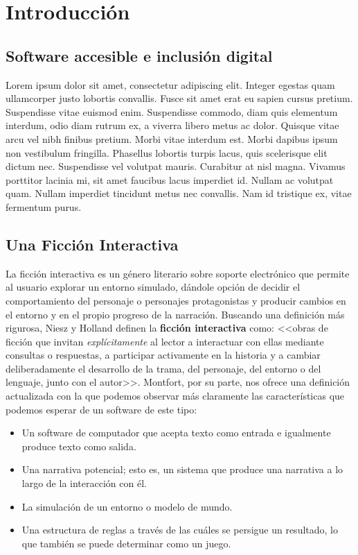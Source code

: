 
\chapter{Introducción}\label{ch:introduccion}

\section{Software accesible e inclusión digital}

Lorem ipsum dolor sit amet\cite{Wilson:2002}, consectetur adipiscing elit. Integer egestas quam ullamcorper justo lobortis convallis. Fusce sit amet erat eu sapien cursus pretium. Suspendisse vitae euismod enim. Suspendisse commodo, diam quis elementum interdum, odio diam rutrum ex, a viverra libero metus ac dolor. Quisque vitae arcu vel nibh finibus pretium. Morbi vitae interdum est. Morbi dapibus ipsum non vestibulum fringilla. Phasellus lobortis turpis lacus, quis scelerisque elit dictum nec. Suspendisse vel volutpat mauris. Curabitur at nisl magna. Vivamus porttitor lacinia mi, sit amet faucibus lacus imperdiet id. Nullam ac volutpat quam. Nullam imperdiet tincidunt metus nec convallis. Nam id tristique ex, vitae fermentum purus.

\section{Una Ficción Interactiva}

La ficción interactiva es un género literario sobre soporte electrónico que permite al usuario explorar un entorno simulado, dándole opción de decidir el comportamiento del personaje o personajes protagonistas y producir cambios en el entorno y en el propio progreso de la narración. Buscando una definición más rigurosa, Niesz y Holland definen la \textbf{ficción interactiva} como: <<obras de ficción que invitan \emph{explícitamente} al lector a interactuar con ellas mediante consultas o respuestas, a participar activamente en la historia y a cambiar deliberadamente el desarrollo de la trama, del personaje, del entorno o del lenguaje, junto con el autor>>\cite{Niesz:Holland:1984}. Montfort, por su parte, nos ofrece una definición actualizada con la que podemos observar más claramente las características que podemos esperar de un software de este tipo\cite{Montfort:2004}:

\begin{itemize}
\item Un software de computador que acepta texto como entrada e igualmente produce texto como salida.

\item Una narrativa potencial; esto es, un sistema que produce una narrativa a lo largo de la interacción con él.

\item La simulación de un entorno o modelo de mundo.

\item Una estructura de reglas a través de las cuáles se persigue un resultado, lo que también se puede determinar como un juego.
\end{itemize}

